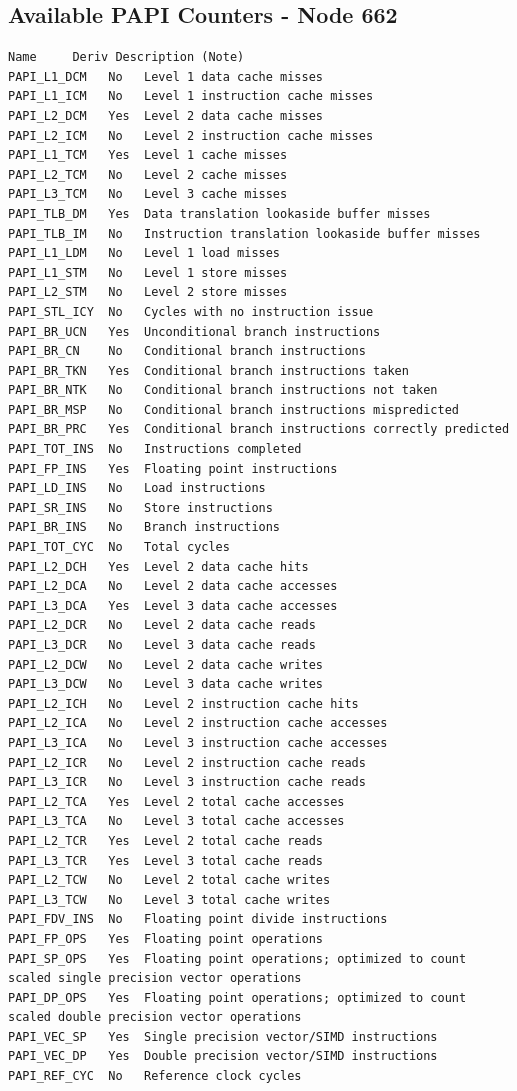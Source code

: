 \documentclass{article}
\begin{document}
\begin{appendices}
\section{Available PAPI Counters - Node 662}
\begin{Verbatim}[fontsize=\footnotesize]
    Name     Deriv Description (Note)
PAPI_L1_DCM   No   Level 1 data cache misses
PAPI_L1_ICM   No   Level 1 instruction cache misses
PAPI_L2_DCM   Yes  Level 2 data cache misses
PAPI_L2_ICM   No   Level 2 instruction cache misses
PAPI_L1_TCM   Yes  Level 1 cache misses
PAPI_L2_TCM   No   Level 2 cache misses
PAPI_L3_TCM   No   Level 3 cache misses
PAPI_TLB_DM   Yes  Data translation lookaside buffer misses
PAPI_TLB_IM   No   Instruction translation lookaside buffer misses
PAPI_L1_LDM   No   Level 1 load misses
PAPI_L1_STM   No   Level 1 store misses
PAPI_L2_STM   No   Level 2 store misses
PAPI_STL_ICY  No   Cycles with no instruction issue
PAPI_BR_UCN   Yes  Unconditional branch instructions
PAPI_BR_CN    No   Conditional branch instructions
PAPI_BR_TKN   Yes  Conditional branch instructions taken
PAPI_BR_NTK   No   Conditional branch instructions not taken
PAPI_BR_MSP   No   Conditional branch instructions mispredicted
PAPI_BR_PRC   Yes  Conditional branch instructions correctly predicted
PAPI_TOT_INS  No   Instructions completed
PAPI_FP_INS   Yes  Floating point instructions
PAPI_LD_INS   No   Load instructions
PAPI_SR_INS   No   Store instructions
PAPI_BR_INS   No   Branch instructions
PAPI_TOT_CYC  No   Total cycles
PAPI_L2_DCH   Yes  Level 2 data cache hits
PAPI_L2_DCA   No   Level 2 data cache accesses
PAPI_L3_DCA   Yes  Level 3 data cache accesses
PAPI_L2_DCR   No   Level 2 data cache reads
PAPI_L3_DCR   No   Level 3 data cache reads
PAPI_L2_DCW   No   Level 2 data cache writes
PAPI_L3_DCW   No   Level 3 data cache writes
PAPI_L2_ICH   No   Level 2 instruction cache hits
PAPI_L2_ICA   No   Level 2 instruction cache accesses
PAPI_L3_ICA   No   Level 3 instruction cache accesses
PAPI_L2_ICR   No   Level 2 instruction cache reads
PAPI_L3_ICR   No   Level 3 instruction cache reads
PAPI_L2_TCA   Yes  Level 2 total cache accesses
PAPI_L3_TCA   No   Level 3 total cache accesses
PAPI_L2_TCR   Yes  Level 2 total cache reads
PAPI_L3_TCR   Yes  Level 3 total cache reads
PAPI_L2_TCW   No   Level 2 total cache writes
PAPI_L3_TCW   No   Level 3 total cache writes
PAPI_FDV_INS  No   Floating point divide instructions
PAPI_FP_OPS   Yes  Floating point operations
PAPI_SP_OPS   Yes  Floating point operations; optimized to count scaled single precision vector operations
PAPI_DP_OPS   Yes  Floating point operations; optimized to count scaled double precision vector operations
PAPI_VEC_SP   Yes  Single precision vector/SIMD instructions
PAPI_VEC_DP   Yes  Double precision vector/SIMD instructions
PAPI_REF_CYC  No   Reference clock cycles 
\end{Verbatim}


\end{appendices}
\end{document}
